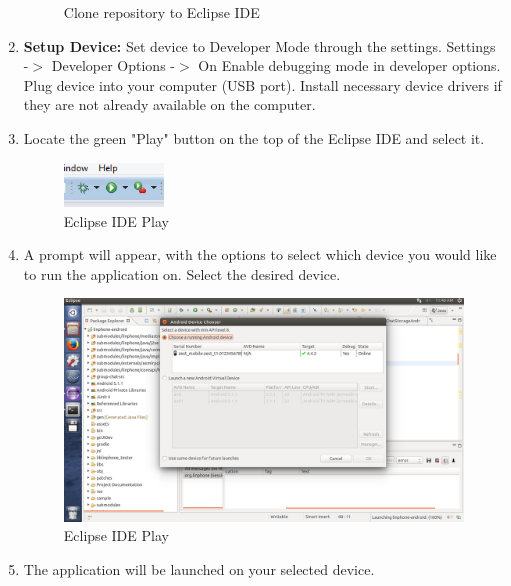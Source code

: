 \documentclass[11pt]{article}
\begin{document}
\begin{enumerate}
\begin{figure}[H]
\caption{Clone repository to Eclipse IDE}
\label{eclipse_ide_repo}
\end{figure}
\item \textbf{Setup Device: } Set device to Developer Mode through the settings. 
\subitem Settings -$>$ Developer Options -$>$ On
\subitem Enable debugging mode in developer options.
\subitem Plug device into your computer (USB port).
\subitem Install necessary device drivers if they are not already available on the computer.
\item Locate the green "Play" button on the top of the Eclipse IDE and select it.
\begin{figure}[H]
\centering
\includegraphics[width=100px]{./images/eclipsePlay.png}
\caption{Eclipse IDE Play}
\label{eclipse_play}
\end{figure}
\item A prompt will appear, with the options to select which device you would like to run the application on. Select the desired device.
\begin{figure}[H]
\includegraphics[width=5in]{./images/ChooseDeviceScreenShot.png}
\caption{Eclipse IDE Play}
\label{choose_dev}
\end{figure}
\item The application will be launched on your selected device.
\end{enumerate}
\end{document}
